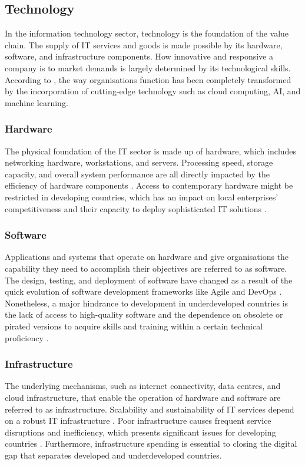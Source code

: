 \subsection{Technology}
\par{In the information technology sector, technology is the foundation of the value chain. The supply of IT services and goods is made possible by its hardware, software, and infrastructure components. How innovative and responsive a company is to market demands is largely determined by its technological skills. According to \cite{brynjolfsson2014second}, the way organisations function has been completely transformed by the incorporation of cutting-edge technology such as cloud computing, AI, and machine learning.}
\subsubsection{Hardware}
\par{The physical foundation of the IT sector is made up of hardware, which includes networking hardware, workstations, and servers. Processing speed, storage capacity, and overall system performance are all directly impacted by the efficiency of hardware components \citep{hennessy2017computer}. Access to contemporary hardware might be restricted in developing countries, which has an impact on local enterprises' competitiveness and their capacity to deploy sophisticated IT solutions \citep{heeks2017information}.}
\subsubsection{Software}
\par{Applications and systems that operate on hardware and give organisations the capability they need to accomplish their objectives are referred to as software. The design, testing, and deployment of software have changed as a result of the quick evolution of software development frameworks like Agile and DevOps \citep{bass2015devops}. Nonetheless, a major hindrance to development in underdeveloped countries is the lack of access to high-quality software and the dependence on obsolete or pirated versions to acquire skills and training within a certain technical proficiency \citep{ojo2020political}.}
\subsubsection{Infrastructure}
\par{The underlying mechanisms, such as internet connectivity, data centres, and cloud infrastructure, that enable the operation of hardware and software are referred to as infrastructure. Scalability and sustainability of IT services depend on a robust IT infrastructure \citep{ross2006enterprise}. Poor infrastructure causes frequent service disruptions and inefficiency, which presents significant issues for developing countries \citep{ojo2020political}. Furthermore, infrastructure spending is essential to closing the digital gap that separates developed and underdeveloped countries.}

